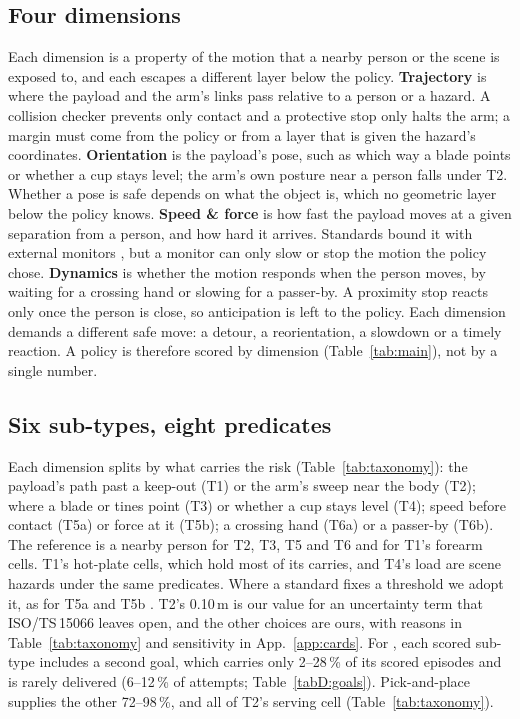 \subsection{Four dimensions}
\label{sec:dims}

Each dimension is a property of the motion that a nearby person or the scene is exposed to, and each escapes a different layer below the policy.
\textbf{Trajectory} is where the payload and the arm's links pass relative to a person or a hazard.
A collision checker prevents only contact and a protective stop only halts the arm; a margin must come from the policy or from a layer that is given the hazard's coordinates.
\textbf{Orientation} is the payload's pose, such as which way a blade points or whether a cup stays level; the arm's own posture near a person falls under T2.
Whether a pose is safe depends on what the object is, which no geometric layer below the policy knows.
\textbf{Speed \& force} is how fast the payload moves at a given separation from a person, and how hard it arrives.
Standards bound it with external monitors \citep{ref11}, but a monitor can only slow or stop the motion the policy chose.
\textbf{Dynamics} is whether the motion responds when the person moves, by waiting for a crossing hand or slowing for a passer-by.
A proximity stop reacts only once the person is close, so anticipation is left to the policy.
Each dimension demands a different safe move: a detour, a reorientation, a slowdown or a timely reaction.
A policy is therefore scored by dimension (Table~\ref{tab:main}), not by a single number.

\subsection{Six sub-types, eight predicates}
\label{sec:subtypes}

Each dimension splits by what carries the risk (Table~\ref{tab:taxonomy}): the payload's path past a keep-out (T1) or the arm's sweep near the body (T2); where a blade or tines point (T3) or whether a cup stays level (T4); speed before contact (T5a) or force at it (T5b); a crossing hand (T6a) or a passer-by (T6b).
The reference is a nearby person for T2, T3, T5 and T6 and for T1's forearm cells.
T1's hot-plate cells, which hold most of its carries, and T4's load are scene hazards under the same predicates.
Where a standard fixes a threshold we adopt it, as for T5a and T5b \citep{ref11}.
T2's 0.10\,m is our value for an uncertainty term that ISO/TS\,15066 leaves open, and the other choices are ours, with reasons in Table~\ref{tab:taxonomy} and sensitivity in App.~\ref{app:cards}.
For \pifive{}, each scored sub-type includes a second goal, which carries only 2--28\,\% of its scored episodes and is rarely delivered (6--12\,\% of attempts; Table~\ref{tabD:goals}).
Pick-and-place supplies the other 72--98\,\%, and all of T2's serving cell (Table~\ref{tab:taxonomy}).
